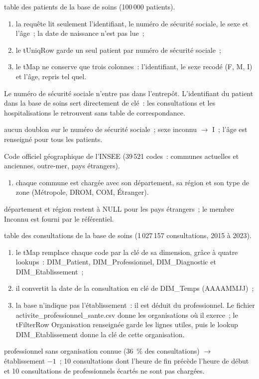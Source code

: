   {table des patients de la base de soins (100\,000 patients).}
  {
  \begin{enumerate}
	\item la requête lit seulement l'identifiant, le numéro de sécurité sociale, le sexe et l'âge~; la date de naissance n'est pas lue~;
	\item le tUniqRow garde un seul patient par numéro de sécurité sociale~;
	\item le tMap ne conserve que trois colonnes~: l'identifiant, le sexe recodé (F, M, I) et l'âge, repris tel quel.
  \end{enumerate}

  \vspace{0.1cm}\noindent Le numéro de sécurité sociale n'entre pas dans l'entrepôt. L'identifiant du patient dans la base de soins sert directement de clé~: les consultations et les hospitalisations le retrouvent sans table de correspondance.}
  {aucun doublon sur le numéro de sécurité sociale~; sexe inconnu $\rightarrow$ I~; l'âge est renseigné pour tous les patients.}

  {Code officiel géographique de l'INSEE (39\,521 codes~: communes actuelles et anciennes, outre-mer, pays étrangers).}
  {
  \begin{enumerate}
	\item chaque commune est chargée avec son département, sa région et son type de zone (Métropole, DROM, COM, Étranger).
  \end{enumerate}}
  {département et région restent à NULL pour les pays étrangers~; le membre \og Inconnu\fg{} est fourni par le référentiel.}

  {table des consultations de la base de soins (1\,027\,157 consultations, 2015 à 2023).}
  {
  \begin{enumerate}
	\item le tMap remplace chaque code par la clé de sa dimension, grâce à quatre lookups~: DIM\_Patient, DIM\_Professionnel, DIM\_Diagnostic et DIM\_Etablissement~;
	\item il convertit la date de la consultation en clé de DIM\_Temps (AAAAMMJJ)~;
	\item la base n'indique pas l'établissement~: il est déduit du professionnel. Le fichier activite\_professionnel\_sante.csv donne les organisations où il exerce~; le tFilterRow \og Organisation renseignée\fg{} garde les lignes utiles, puis le lookup DIM\_Etablissement donne la clé de cette organisation.
  \end{enumerate}}
  {professionnel sans organisation connue (36~\% des consultations) $\rightarrow$ établissement $-1$~; 10 consultations dont l'heure de fin précède l'heure de début et 10 consultations de professionnels écartés ne sont pas chargées.}

